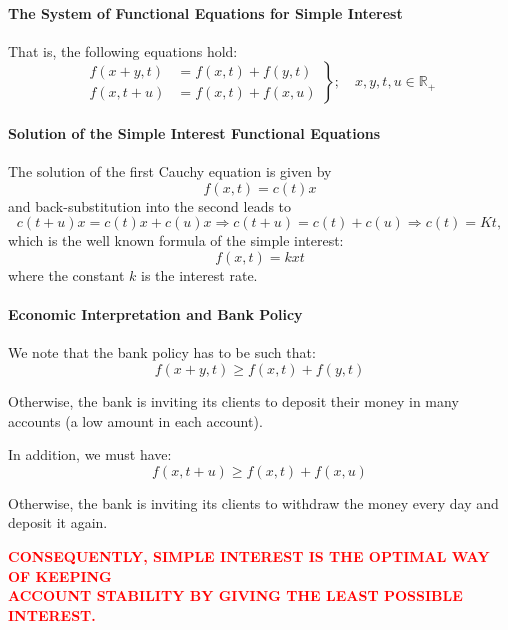 \paragraph{The System of Functional Equations for Simple Interest}
That is, the following equations hold:
\begin{equation}
\left.\begin{aligned}
f(x + y, t) &= f(x, t) + f(y, t) \\
f(x, t + u) &= f(x, t) + f(x, u)
\end{aligned}\right\} ; \quad x, y, t, u \in \mathbb{R}_+
\end{equation}

\paragraph{Solution of the Simple Interest Functional Equations}
The solution of the first Cauchy equation is given by
\begin{equation}
\boxed{f(x, t) = c(t)x}
\end{equation}
and back-substitution into the second leads to
\begin{equation}
c(t+u)x = c(t)x+c(u)x \Rightarrow c(t+u) = c(t)+c(u) \Rightarrow c(t) = Kt,
\end{equation}
which is the well known formula of the simple interest:
\begin{equation}
\boxed{f(x, t) = kxt}
\end{equation}
where the constant $k$ is the interest rate.

\paragraph{Economic Interpretation and Bank Policy}
We note that the bank policy has to be such that:
\begin{equation}
\boxed{f(x + y, t) \geq f(x, t) + f(y, t)}
\end{equation}

Otherwise, the bank is inviting its clients to deposit their money in many accounts (a low amount in each account).

In addition, we must have:
\begin{equation}
\boxed{f(x, t + u) \geq f(x, t) + f(x, u)}
\end{equation}

Otherwise, the bank is inviting its clients to withdraw the money every day and deposit it again.

\vspace{3mm}
\begin{center}
   \textcolor{red}{\bf CONSEQUENTLY, SIMPLE INTEREST IS THE OPTIMAL WAY OF KEEPING\\ ACCOUNT STABILITY BY GIVING THE LEAST POSSIBLE INTEREST.}

\end{center}
\vspace{3mm}

